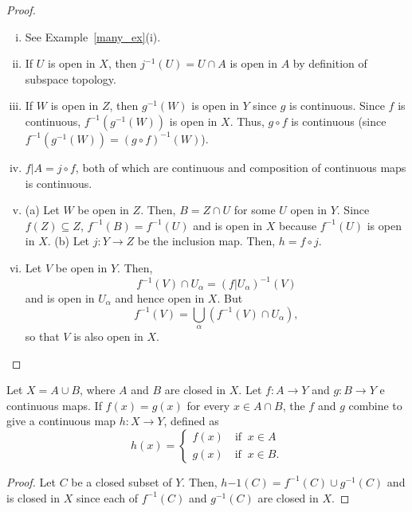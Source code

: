 \documentclass[a4paper,english,12pt]{article}
\begin{document}
\begin{proof}
\begin{enumerate}[i)]
\item See Example~\ref{many_ex}(i).
\item If $U$ is open in $X$, then $j^{-1}(U)=U\cap A$ is open in $A$ by definition of subspace topology.
\item If $W$ is open in $Z$, then $g^{-1}(W)$ is open in $Y$ since $g$ is continuous. Since $f$ is continuous, $f^{-1}(g^{-1}(W))$ is open in $X$. Thus, $g\circ f$ is continuous (since $f^{-1}(g^{-1}(W))=(g\circ f)^{-1}(W)$).
\item $f|A=j\circ f$, both of which are continuous and composition of continuous maps is continuous.
\item (a) Let $W$ be open in $Z$. Then, $B=Z\cap U$ for some $U$ open in $Y$. Since $f(Z)\subseteq Z$, $f^{-1}(B)=f^{-1}(U)$ and is open in $X$ because $f^{-1}(U)$ is open in $X$.
(b) Let $j:Y\rightarrow Z$ be the inclusion map. Then, $h=f\circ j$.
\item Let $V$ be open in $Y$. Then, 
\begin{equation*}
f^{-1}(V)\cap U_{\alpha}=(f|U_{\alpha})^{-1}(V)
\end{equation*}
and is open in $U_{\alpha}$ and hence open in $X$. But 
\begin{equation*}
f^{-1}(V)=\bigcup _{\alpha}\left( f^{-1}(V)\cap U_{\alpha}\right),
\end{equation*}
so that $V$ is also open in $X$.
\end{enumerate}
\end{proof}

\begin{thm}
Let $X=A\cup B$, where $A$ and $B$ are closed in $X$. Let $f:A\rightarrow Y$ and $g:B\rightarrow Y$ e continuous maps. If $f(x)=g(x)$ for every $x\in A\cap B$, the $f$ and $g$ combine to give a continuous map $h:X\rightarrow Y$, defined as 
\begin{equation*}
h(x)=\begin{cases} f(x) \quad \mathrm{if } \;\; x\in A \\ g(x) \quad \mathrm{if}\;\; x\in B.
\end{cases}
\end{equation*}
\end{thm}
\begin{proof}
Let $C$ be a closed subset of $Y$. Then, $h{-1}(C)=f^{-1}(C)\cup g^{-1}(C)$ and is closed in $X$ since each of $f^{-1}(C)$ and $g^{-1}(C)$ are closed in $X$.
\end{proof}
\end{document}
